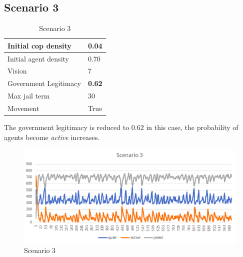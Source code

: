 \documentclass[11pt]{article}
\begin{document}
      \subsection{Scenario 3}
      \begin{table}[ht]
        \begin{center}
          \begin{tabular}{|l|l|}
          \hline
            Initial cop density & 0.04 \\
          \hline
            Initial agent density & 0.70 \\
          \hline
            Vision & 7 \\
          \hline
            Government Legitimacy & \textbf{0.62} \\
          \hline
            Max jail term & 30 \\
          \hline
            Movement & True \\
          \hline
          \end{tabular}
          \caption{Scenario 3}\label{table3}
        \end{center}
      \end{table}
      The government legitimacy is reduced to $0.62$ in this case, the probability
      of agents become \textit{active} increases.
      \begin{figure}[h!]
        \includegraphics[width=\linewidth]{Scenario_3.png}
        \caption{Scenario 3}
        \label{fig:scenario}
      \end{figure}
\end{document}
